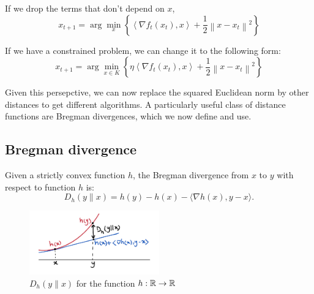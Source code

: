 If we drop the terms that don't depend on $x$,
\begin{equation}
\label{eq: non-cos PGD}
    x_{t+1}=\arg \min _x\left\{\left\langle\nabla f_t\left(x_t\right), x\right\rangle+\frac{1}{2}\left\|x-x_t\right\|^2\right\}
\end{equation}

If we have a constrained problem, we can change it to the following form:
\begin{equation}
\label{eq: cos PGD }
    x_{t+1}=\arg \min _{x \in K}\left\{\eta\left\langle\nabla f_t\left(x_t\right), x\right\rangle+\frac{1}{2}\left\|x-x_t\right\|^2\right\}
\end{equation}

Given this persepctive, we can now replace the squared Euclidean norm by other distances to get different algorithms. A particularly useful class of distance functions are Bregman divergences, which we now define and use.

\subsection{Bregman divergence}

\begin{definition}
\label{def: Bregman divergence}
Given a strictly convex function $h$, the Bregman divergence from $x$ to $y$ with respect to function $h$ is:
$$
D_h(y \| x)=h(y)-h(x)-\langle\nabla h(x), y-x\rangle .
$$
\end{definition}

\begin{figure}[H]
    \centering
    \includegraphics[width=0.5\textwidth]{figures/MD1.png}
    \caption{$D_h(y\|x)$ for the function $h:\mathbb{R} \to \mathbb{R}$}
\end{figure}


